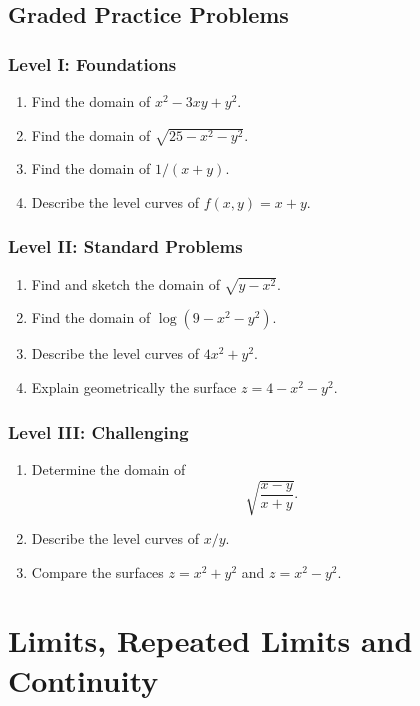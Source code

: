\documentclass[11pt,oneside]{book}
\theoremstyle{studentthm}
\theoremstyle{definition}
\begin{document}
\section{Graded Practice Problems}

\subsection*{Level I: Foundations}
\begin{enumerate}
\item Find the domain of \(x^2-3xy+y^2\).
\item Find the domain of \(\sqrt{25-x^2-y^2}\).
\item Find the domain of \(1/(x+y)\).
\item Describe the level curves of \(f(x,y)=x+y\).
\end{enumerate}

\subsection*{Level II: Standard Problems}
\begin{enumerate}
\item Find and sketch the domain of \(\sqrt{y-x^2}\).
\item Find the domain of \(\log(9-x^2-y^2)\).
\item Describe the level curves of \(4x^2+y^2\).
\item Explain geometrically the surface \(z=4-x^2-y^2\).
\end{enumerate}

\subsection*{Level III: Challenging}
\begin{enumerate}
\item Determine the domain of
\[
\sqrt{\frac{x-y}{x+y}}.
\]
\item Describe the level curves of \(x/y\).
\item Compare the surfaces \(z=x^2+y^2\) and \(z=x^2-y^2\).
\end{enumerate}

\chapter{Limits, Repeated Limits and Continuity}
\end{document}
